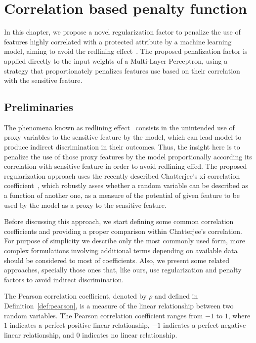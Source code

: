 \chapter{Correlation based penalty function}

In this chapter, we propose a novel regularization factor to penalize the use of features highly correlated with a protected attribute by a machine learning model, aiming to avoid the redlining effect~\citep{Pedreschi2008}. The proposed penalization factor is applied directly to the input weights of a Multi-Layer Perceptron, using a strategy that proportionately penalizes features use based on their correlation with the sensitive feature.

\section{Preliminaries}

The phenomena known as redlining effect~\citep{Pedreschi2008} consists in the unintended use of proxy variables to the sensitive feature by the model, which can lead model to produce indirect discrimination in their outcomes.  Thus, the insight here is to penalize the use of those proxy features by the model proportionally according its correlation with sensitive feature in order to avoid redlining effed. The proposed regularization approach uses the recently described Chatterjee's xi correlation coefficient~\cite{chatterjee2020new}, which robustly asses whether a random variable can be described as a function of another one, as a measure of the potential of given feature to be used by the model as a proxy to the sensitive feature. 

Before discussing this approach, we start defining some common correlation coefficients and providing a proper comparison within Chatterjee's correlation. For purpose of simplicity we describe only the most commonly used form, more complex formulations involving additional terms depending on available data should be considered to most of coefficients. Also, we present some related approaches, specially those ones that, like ours, use regularization and penalty factors to avoid indirect discrimination.

The Pearson correlation coefficient, denoted by $\rho$ and defined in Definition~\ref{def:pearson}, is a measure of the linear relationship between two random variables. The Pearson correlation coefficient ranges from $-1$ to $1$, where $1$ indicates a perfect positive linear relationship, $-1$ indicates a perfect negative linear relationship, and $0$ indicates no linear relationship.


